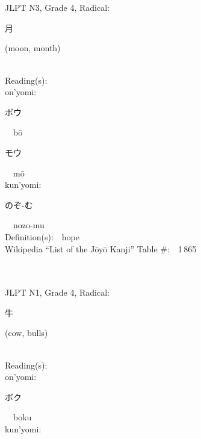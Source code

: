 \begin{multicols}{2}
\ \ \\
{\fontsize{34pt}{40pt}  }\ \ \\  %
{JLPT N3, Grade 4, Radical:\ \ {\begin{CJK}{UTF8}{min} 月 \end{CJK}} (moon, month) } \\
Reading(s):\ \ \\
{\hspace*{1em}}on'yomi:\ \ \\
{\hspace*{2em}}{\begin{CJK}{UTF8}{min} ボウ \end{CJK}}\ \ b\=o\ \ \\
{\hspace*{2em}}{\begin{CJK}{UTF8}{min} モウ \end{CJK}}\ \ m\=o\ \ \\
{\hspace*{1em}}kun'yomi:\ \ \\
{\hspace*{2em}}{\begin{CJK}{UTF8}{min} のぞ-む \end{CJK}}\ \ nozo-mu\ \ \\
Definition(s):\ \ hope \\
Wikipedia ``List of the J\=oy\=o Kanji'' Table \#:\ \ 1\,865 \\
\ \ \\
{\fontsize{34pt}{40pt}  }\ \ \\  %
{JLPT N1, Grade 4, Radical:\ \ {\begin{CJK}{UTF8}{min} 牛 \end{CJK}} (cow, bulls) } \\
Reading(s):\ \ \\
{\hspace*{1em}}on'yomi:\ \ \\
{\hspace*{2em}}{\begin{CJK}{UTF8}{min} ボク \end{CJK}}\ \ boku\ \ \\
{\hspace*{1em}}kun'yomi:\ \ \\

\end{multicols}
